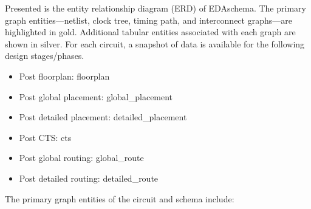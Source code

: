 \documentclass[letterpaper,10pt,english]{sphinxmanual}
\begin{document}
\sphinxAtStartPar
Presented is the entity relationship diagram (ERD) of EDA\sphinxhyphen{}schema. The primary graph entities—netlist, clock tree, timing path, and interconnect graphs—are highlighted in gold. Additional tabular entities associated with each graph are shown in silver.  For each circuit, a snapshot of data is available for the following design stages/phases.
\begin{itemize}
\item {} 
\sphinxAtStartPar
Post floorplan: floorplan

\item {} 
\sphinxAtStartPar
Post global placement: global\_placement

\item {} 
\sphinxAtStartPar
Post detailed placement: detailed\_placement

\item {} 
\sphinxAtStartPar
Post CTS: cts

\item {} 
\sphinxAtStartPar
Post global routing: global\_route

\item {} 
\sphinxAtStartPar
Post detailed routing: detailed\_route

\end{itemize}


\sphinxAtStartPar
The primary graph entities of the circuit and schema include:
\end{document}

